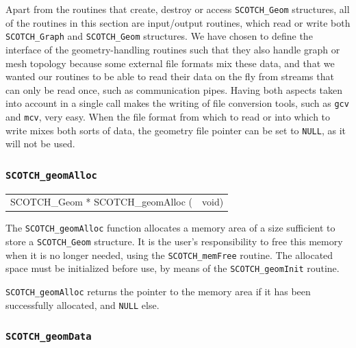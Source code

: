 Apart from the routines that create, destroy or access
{\tt SCOTCH\_\lbt Geom} structures, all of the routines
in this section are input/output routines, which read or
write both {\tt SCOTCH\_\lbt Graph} and {\tt SCOTCH\_\lbt Geom}
structures. We have chosen to define the interface of the
geometry-handling routines such that they also handle
graph or mesh topology because some external file formats
mix these data, and that we wanted our routines to be able
to read their data on the fly from streams that can only be
read once, such as communication pipes. Having both aspects
taken into account in a single call makes the writing of
file conversion tools, such as {\tt gcv} and {\tt mcv},
very easy. When the file format from which to read or into
which to write mixes both sorts of data, the geometry file
pointer can be set to {\tt NULL}, as it will not be used.

\subsubsection{{\tt SCOTCH\_geomAlloc}}

\begin{itemize}
\progsyn

{\tt\begin{tabular}{l@{}l}
SCOTCH\_Geom * SCOTCH\_geomAlloc ( & void)
\end{tabular}}

\progdes

The {\tt SCOTCH\_geomAlloc} function allocates a memory area of a
size sufficient to store a {\tt SCOTCH\_\lbt Geom} structure. It is
the user's responsibility to free this memory when it is no longer
needed, using the {\tt SCOTCH\_\lbt mem\lbt Free} routine. The
allocated space must be initialized before use, by means of the
{\tt SCOTCH\_\lbt geom\lbt Init} routine.

\progret

{\tt SCOTCH\_geomAlloc} returns the pointer to the memory area if it
has been successfully allocated, and {\tt NULL} else.
\end{itemize}

\subsubsection{{\tt SCOTCH\_geomData}}
\label{sec-lib-func-geomdata}

